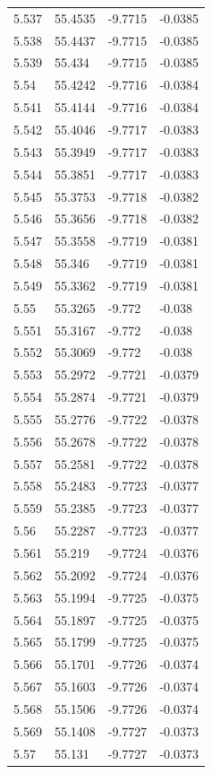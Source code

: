 \begin{tabular}{llll}
5.537 & 55.4535 & -9.7715 & -0.0385 \\
5.538 & 55.4437 & -9.7715 & -0.0385 \\
5.539 & 55.434 & -9.7715 & -0.0385 \\
5.54 & 55.4242 & -9.7716 & -0.0384 \\
5.541 & 55.4144 & -9.7716 & -0.0384 \\
5.542 & 55.4046 & -9.7717 & -0.0383 \\
5.543 & 55.3949 & -9.7717 & -0.0383 \\
5.544 & 55.3851 & -9.7717 & -0.0383 \\
5.545 & 55.3753 & -9.7718 & -0.0382 \\
5.546 & 55.3656 & -9.7718 & -0.0382 \\
5.547 & 55.3558 & -9.7719 & -0.0381 \\
5.548 & 55.346 & -9.7719 & -0.0381 \\
5.549 & 55.3362 & -9.7719 & -0.0381 \\
5.55 & 55.3265 & -9.772 & -0.038 \\
5.551 & 55.3167 & -9.772 & -0.038 \\
5.552 & 55.3069 & -9.772 & -0.038 \\
5.553 & 55.2972 & -9.7721 & -0.0379 \\
5.554 & 55.2874 & -9.7721 & -0.0379 \\
5.555 & 55.2776 & -9.7722 & -0.0378 \\
5.556 & 55.2678 & -9.7722 & -0.0378 \\
5.557 & 55.2581 & -9.7722 & -0.0378 \\
5.558 & 55.2483 & -9.7723 & -0.0377 \\
5.559 & 55.2385 & -9.7723 & -0.0377 \\
5.56 & 55.2287 & -9.7723 & -0.0377 \\
5.561 & 55.219 & -9.7724 & -0.0376 \\
5.562 & 55.2092 & -9.7724 & -0.0376 \\
5.563 & 55.1994 & -9.7725 & -0.0375 \\
5.564 & 55.1897 & -9.7725 & -0.0375 \\
5.565 & 55.1799 & -9.7725 & -0.0375 \\
5.566 & 55.1701 & -9.7726 & -0.0374 \\
5.567 & 55.1603 & -9.7726 & -0.0374 \\
5.568 & 55.1506 & -9.7726 & -0.0374 \\
5.569 & 55.1408 & -9.7727 & -0.0373 \\
5.57 & 55.131 & -9.7727 & -0.0373 \\

\end{tabular}
